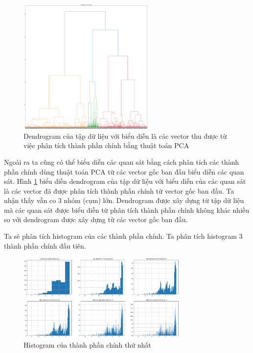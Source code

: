 \begin{figure}[H]
    \centering
    \includegraphics[width=0.6\textwidth]{figures/Thanh/Data_Analysis/Non_null_dendrogram_PCA_features.png}
    \caption{Dendrogram của tập dữ liệu với biểu diễn là các vector thu được từ việc phân tích thành phần chính bằng thuật toán PCA}
    \label{fig:Non_null_dendrogram_PCA_features}
\end{figure}

Ngoài ra ta cũng có thể biểu diễn các quan sát bằng cách phân tích các thành phần chính dùng thuật toán PCA từ các vector gốc ban đầu biểu diễn các quan sát.
Hình \ref{fig:Non_null_dendrogram_PCA_features} biểu diễn dendrogram của tập dữ liệu với biểu diễn của các quan sát là các vector đã được phân tích thành phần chính từ vector gốc ban đầu.
Ta nhận thấy vẫn co 3 nhóm (cụm) lớn. Dendrogram được xây dựng từ tập dữ liệu mà các quan sát được biểu diễn từ phân tích thành phần chính không khác nhiều so với dendrogram được xây dựng từ các vector gốc ban đầu.

Ta sẽ phân tích histogram của các thành phần chính.
Ta phân tích histogram 3 thành phần chính đầu tiên.

\begin{figure}[H]
    \centering
    \includegraphics[width=0.75\textwidth]{figures/Thanh/Data_Analysis/Non_null_histogram_PCA_feature_0.png}
    \caption{Histogram của thành phần chính thứ nhất}
    \label{fig:Non_null_histogram_PCA_feature_0}
\end{figure}

